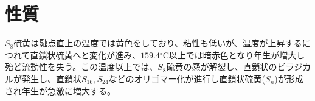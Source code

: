 \section{性質}{
	  $S_8$硫黄は融点直上の温度では黄色をしており、粘性も低いが、温度が上昇するにつれて直鎖状硫黄へと変化が進み、$159.4 {}^\circ\mathrm{C}$以上では暗赤色となり年生が増大し殆ど流動性を失う。この温度以上では、$S_8$硫黄の感が解裂し、直鎖状のビラジカルが発生し、直鎖状$S_{16}, S_{24}$などのオリゴマー化が進行し直鎖状硫黄($S_n$)が形成され年生が急激に増大する。
}
